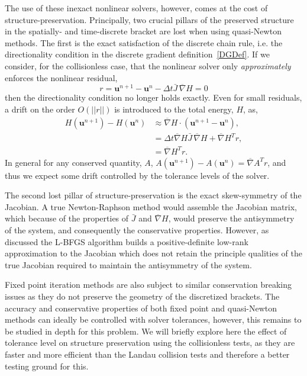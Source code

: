 \documentclass[preprint,12pt]{elsarticle}
\theoremstyle{definition}
\begin{document}
The use of these inexact nonlinear solvers, however, comes at the cost of structure-preservation. Principally, two crucial pillars of the preserved structure in the spatially- and time-discrete bracket are lost when using quasi-Newton methods. The first is the exact satisfaction of the discrete chain rule, i.e. the directionality condition in the discrete gradient definition~\ref{DGDef}. If we consider, for the collisionless case, that the nonlinear solver only \textit{approximately} enforces the nonlinear residual,
\begin{equation}
    r = \boldsymbol{u}^{n+1} - \boldsymbol{u}^{n} - \Delta t \bar{J} \, \overline{\nabla} H = 0
\end{equation}
then the directionality condition no longer holds exactly. Even for small residuals, a drift on the order $O(||r||)$ is introduced to the total energy, $H$, as,
\begin{align*}
    H(\boldsymbol{u}^{n+1}) - H(\boldsymbol{u}^{n}) &\approx \overline{\nabla} H \cdot \left(\boldsymbol{u}^{n+1} - \boldsymbol{u}^{n}\right), \\
    &=\Delta t \overline{\nabla} H \bar{J} \, \overline{\nabla} H + \overline{\nabla} H^T r,\\
    &=\overline{\nabla} H^T r.
\end{align*}
In general for any conserved quantity, $A$, $A(\boldsymbol{u}^{n+1}) - A(\boldsymbol{u}^{n}) = \overline{\nabla} A^T r$, and thus we expect some drift controlled by the tolerance levels of the solver.

The second lost pillar of structure-preservation is the exact skew-symmetry of the Jacobian. A true Newton-Raphson method would assemble the Jacobian matrix, which because of the properties of $\bar{J}$ and $\overline{\nabla} H$, would preserve the antisymmetry of the system, and consequently the conservative properties. However, as discussed the L-BFGS algorithm builds a positive-definite low-rank approximation to the Jacobian which does not retain the principle qualities of the true Jacobian required to maintain the antisymmetry of the system.

Fixed point iteration methods are also subject to similar conservation breaking issues as they do not preserve the geometry of the discretized brackets. The accuracy and conservative properties of both fixed point and quasi-Newton methods can ideally be controlled with solver tolerances, however, this remains to be studied in depth for this problem. We will briefly explore here the effect of tolerance level on structure preservation using the collisionless tests, as they are faster and more efficient than the Landau collision tests and therefore a better testing ground for this. 
\end{document}
